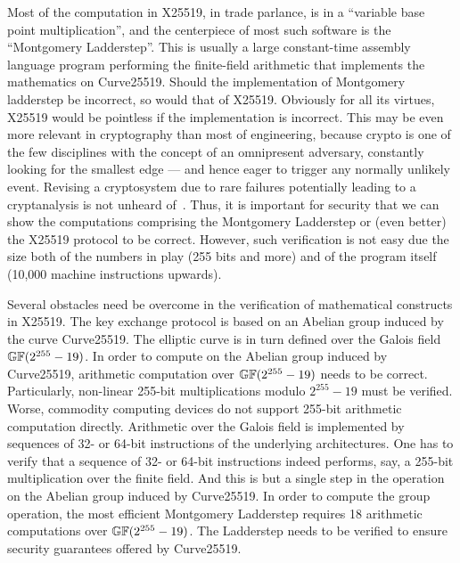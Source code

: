Most of the computation in X25519, in trade parlance, is in a
``variable base point multiplication'', and the centerpiece of most
such software is the ``Montgomery Ladderstep''. This is usually a
large constant-time assembly language program performing the
finite-field arithmetic that implements the mathematics on Curve25519.
Should the implementation of Montgomery ladderstep be incorrect, so
would that of X25519. Obviously for all its virtues, X25519 would be
pointless if the implementation is incorrect. This may be even more
relevant in cryptography than most of engineering, because crypto is
one of the few disciplines with the concept of an omnipresent
adversary, constantly looking for the smallest edge --- and hence
eager to trigger any normally unlikely event. Revising a cryptosystem
due to rare failures potentially leading to a cryptanalysis is not
unheard of~\cite{HNPPSSW:03:IDFSNE}.
Thus, it is important for security that we can show the computations
comprising the Montgomery Ladderstep or (even better) the X25519
protocol to be correct. However, such verification is not easy due
the size both of the numbers in play (255 bits and more) and of the
program itself (10,000 machine instructions upwards).

Several obstacles need be overcome in the verification of mathematical
constructs in X25519. The key exchange protocol is based on an
Abelian group induced by the curve Curve25519. The elliptic
curve is in turn defined over the Galois field $\mathbb{GF}(2^{255} - 19)$. 
In order to compute on the Abelian group induced by Curve25519,
arithmetic computation over $\mathbb{GF}(2^{255} - 19)$ needs to be
correct. Particularly, non-linear 255-bit multiplications modulo
$2^{255} - 19$ must be verified. Worse, commodity computing devices do
not support 255-bit arithmetic computation directly. Arithmetic over
the Galois field is implemented by sequences of 32- or 64-bit
instructions of the underlying architectures. One has to
verify that a sequence of 32- or 64-bit instructions indeed
performs, say, a 255-bit multiplication over the finite field. And this
is but a single step in the operation on the Abelian group induced by
Curve25519. In order to compute the group operation, 
the most efficient Montgomery Ladderstep requires 18 arithmetic 
computations over $\mathbb{GF}(2^{255} - 19)$. The Ladderstep needs to be
verified to ensure security guarantees offered by Curve25519.

